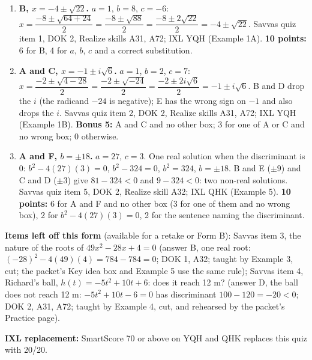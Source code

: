 \documentclass[11pt]{article}
\begin{document}
\begin{enumerate}
\item[1.] \textbf{B, $x=-4\pm\sqrt{22}$.} $a=1$, $b=8$, $c=-6$: $x=\dfrac{-8\pm\sqrt{64+24}}{2}=\dfrac{-8\pm\sqrt{88}}{2}=\dfrac{-8\pm2\sqrt{22}}{2}=-4\pm\sqrt{22}$. Savvas quiz item 1, DOK 2, Realize skills A31, A72; IXL YQH (Example 1A). \textbf{10 points:} 6 for B, 4 for $a$, $b$, $c$ and a correct substitution.
\item[2.] \textbf{A and C, $x=-1\pm i\sqrt{6}$.} $a=1$, $b=2$, $c=7$: $x=\dfrac{-2\pm\sqrt{4-28}}{2}=\dfrac{-2\pm\sqrt{-24}}{2}=\dfrac{-2\pm2i\sqrt6}{2}=-1\pm i\sqrt6$. B and D drop the $i$ (the radicand $-24$ is negative); E has the wrong sign on $-1$ and also drops the $i$. Savvas quiz item 2, DOK 2, Realize skills A31, A72; IXL YQH (Example 1B). \textbf{Bonus 5:} A and C and no other box; 3 for one of A or C and no wrong box; 0 otherwise.
\item[5.] \textbf{A and F, $b=\pm18$.} $a=27$, $c=3$. One real solution when the discriminant is $0$: $b^2-4(27)(3)=0$, $b^2-324=0$, $b^2=324$, $b=\pm18$. B and E ($\pm9$) and C and D ($\pm3$) give $81-324<0$ and $9-324<0$: two non-real solutions. Savvas quiz item 5, DOK 2, Realize skill A32; IXL QHK (Example 5). \textbf{10 points:} 6 for A and F and no other box (3 for one of them and no wrong box), 2 for $b^2-4(27)(3)=0$, 2 for the sentence naming the discriminant.
\end{enumerate}

\textbf{Items left off this form} (available for a retake or Form B):
Savvas item 3, the nature of the roots of $49x^2-28x+4=0$ (answer B, one real root: $(-28)^2-4(49)(4)=784-784=0$; DOK 1, A32; taught by Example 3, cut; the packet's Key idea box and Example 5 use the same rule);
Savvas item 4, Richard's ball, $h(t)=-5t^2+10t+6$: does it reach 12 m? (answer D, the ball does not reach 12 m: $-5t^2+10t-6=0$ has discriminant $100-120=-20<0$; DOK 2, A31, A72; taught by Example 4, cut, and rehearsed by the packet's Practice page).

\textbf{IXL replacement:} SmartScore 70 or above on YQH and QHK replaces this quiz with 20/20.
\end{document}
